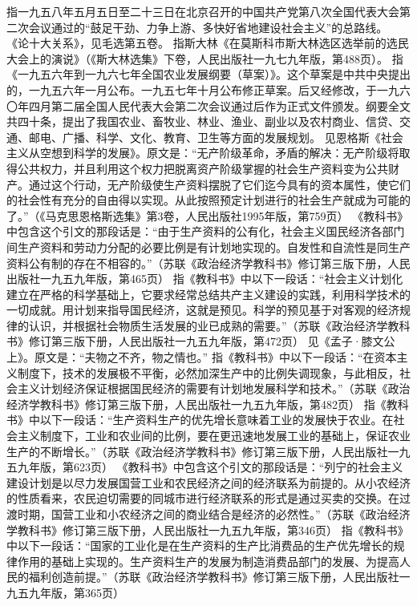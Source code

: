 \begin{maonote}
指一九五八年五月五日至二十三日在北京召开的中国共产党第八次全国代表大会第二次会议通过的“鼓足干劲、力争上游、多快好省地建设社会主义”的总路线。
《论十大关系》，见毛选第五卷。
指斯大林《在莫斯科市斯大林选区选举前的选民大会上的演说》（《斯大林选集》下卷，人民出版社一九七九年版，第488页）。
指《一九五六年到一九六七年全国农业发展纲要（草案）》。这个草案是中共中央提出的，一九五六年一月公布。一九五七年十月公布修正草案。后又经修改，于一九六〇年四月第二届全国人民代表大会第二次会议通过后作为正式文件颁发。纲要全文共四十条，提出了我国农业、畜牧业、林业、渔业、副业以及农村商业、信贷、交通、邮电、广播、科学、文化、教育、卫生等方面的发展规划。
见恩格斯《社会主义从空想到科学的发展》。原文是：“无产阶级革命，矛盾的解决：无产阶级将取得公共权力，并且利用这个权力把脱离资产阶级掌握的社会生产资料变为公共财产。通过这个行动，无产阶级使生产资料摆脱了它们迄今具有的资本属性，使它们的社会性有充分的自由得以实现。从此按照预定计划进行的社会生产就成为可能的了。”（《马克思恩格斯选集》第3卷，人民出版社1995年版，第759页）
《教科书》中包含这个引文的那段话是：“由于生产资料的公有化，社会主义国民经济各部门间生产资料和劳动力分配的必要比例是有计划地实现的。自发性和自流性是同生产资料公有制的存在不相容的。”（苏联《政治经济学教科书》修订第三版下册，人民出版社一九五九年版，第465页）
指《教科书》中以下一段话：“社会主义计划化建立在严格的科学基础上，它要求经常总结共产主义建设的实践，利用科学技术的一切成就。用计划来指导国民经济，这就是预见。科学的预见基于对客观的经济规律的认识，并根据社会物质生活发展的业已成熟的需要。”（苏联《政治经济学教科书》修订第三版下册，人民出版社一九五九年版，第472页）
见《孟子·膝文公上》。原文是：“夫物之不齐，物之情也。”
指《教科书》中以下一段话：“在资本主义制度下，技术的发展极不平衡，必然加深生产中的比例失调现象，与此相反，社会主义计划经济保证根据国民经济的需要有计划地发展科学和技术。”（苏联《政治经济学教科书》修订第三版下册，人民出版社一九五九年版，第482页）
指《教科书》中以下一段话：“生产资料生产的优先增长意味着工业的发展快于农业。在社会主义制度下，工业和农业间的比例，要在更迅速地发展工业的基础上，保证农业生产的不断增长。”（苏联《政治经济学教科书》修订第三版下册，人民出版社一九五九年版，第623页）
《教科书》中包含这个引文的那段话是：“列宁的社会主义建设计划是以尽力发展国营工业和农民经济之间的经济联系为前提的。从小农经济的性质看来，农民迫切需要的同城市进行经济联系的形式是通过买卖的交换。在过渡时期，国营工业和小农经济之间的商业结合是经济的必然性。”（苏联《政治经济学教科书》修订第三版下册，人民出版社一九五九年版，第346页）
指《教科书》中以下一段话：“国家的工业化是在生产资料的生产比消费品的生产优先增长的规律作用的基础上实现的。生产资料生产的发展为制造消费品部门的发展、为提高人民的福利创造前提。”（苏联《政治经济学教科书》修订第三版下册，人民出版社一九五九年版，第365页）

\end{maonote}
